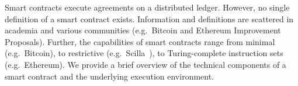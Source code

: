 Smart contracts execute agreements on a distributed ledger. %
However, no single definition of a smart contract exists.
Information and definitions are scattered in academia and various communities (e.g.\ Bitcoin and Ethereum Improvement Proposals).
Further, the capabilities of smart contracts range from minimal (e.g.\ Bitcoin), to restrictive (e.g.\ Scilla~\cite{Sergey2018}), to Turing-complete instruction sets (e.g.\ Ethereum). 
We provide a brief overview of the technical components of a smart contract and the underlying execution environment.

